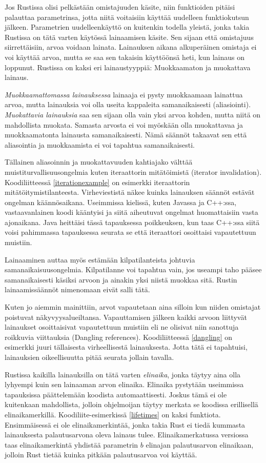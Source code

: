 \documentclass[finnish]{tktltiki2}
\theoremstyle{definition}
\theoremstyle{remark}
\begin{document}
Jos Rustissa olisi pelkästään omistajuuden käsite, niin funktioiden pitäisi palauttaa parametrinsa, jotta niitä voitaisiin käyttää uudelleen funktiokutsun jälkeen. Parametrien uudelleenkäyttö on kuitenkin todella yleistä, jonka takia Rustissa on tätä varten käytössä lainaamisen käsite. Sen sijaan että omistajuus siirrettäisiin, arvoa voidaan lainata. Lainauksen aikana alkuperäinen omistaja ei voi käyttää arvoa, mutta se saa sen takaisin käyttöönsä heti, kun lainaus on loppunut. Rustissa on kaksi eri lainaustyyppiä: Muokkaamaton ja muokattava lainaus.

\textit{Muokkaamattomassa lainauksessa} lainaaja ei pysty muokkaamaan lainattua arvoa, mutta lainauksia voi olla useita kappaleita samanaikaisesti (aliasiointi). \textit{Muokattavia lainauksia} saa sen sijaan olla vain yksi arvoa kohden, mutta niitä on mahdollista muokata. Samasta arvosta ei voi myöskään olla muokattavaa ja muokkaamatonta lainausta samanaikaisesti. Nämä säännöt takaavat sen että aliasointia ja muokkaamista ei voi tapahtua samanaikaisesti.

Tällainen aliasoinnin ja muokattavuuden kahtiajako välttää muistiturvallisuusongelmia kuten iteraattorin mitätöimistä (iterator invalidation). Koodiliitteessä \ref{iterationexample} on esimerkki iteraattorin mitätöitymistilanteesta. Virheviestistä näkee kuinka lainauksen säännöt estävät ongelman käännösaikana. Useimmissa kielissä, kuten Javassa ja C++:ssa, vastaavanlainen koodi kääntyisi ja siitä aiheutuvat ongelmat huomattaisiin vasta ajonaikana. Java heittäisi tässä tapauksessa poikkeuksen, kun taas C++:ssa siitä voisi pahimmassa tapauksessa seurata se että iteraattori osoittaisi vapautettuun muistiin. 

Lainaaminen auttaa myös estämään kilpatilanteista johtuvia samanaikaisuusongelmia. Kilpatilanne voi tapahtua vain, jos useampi taho pääsee samanaikaisesti käsiksi arvoon ja ainakin yksi niistä muokkaa sitä. Rustin lainaamissäännöt nimenomaan eivät salli tätä.

Kuten jo aiemmin mainittiin, arvot vapautetaan aina silloin kun niiden omistajat poistuvat näkyvyysalueiltansa. Vapauttamisen jälkeen kaikki arvoon liittyvät lainaukset osoittaisivat vapautettuun muistiin eli ne olisivat niin sanottuja roikkuvia viittauksia (Dangling references). Koodiliitteessä \ref{dangling} on esimerkki juuri tällaisesta virheellisestä lainauksesta. Jotta tätä ei tapahtuisi, lainauksien oikeellisuutta pitää seurata jollain tavalla. 

Rustissa kaikilla lainauksilla on tätä varten \textit{elinaika}, jonka täytyy aina olla lyhyempi kuin sen lainaaman arvon elinaika. Elinaika pystytään useimmissa tapauksissa päättelemään koodista automaattisesti. Joskus tämä ei ole kuitenkaan mahdollista, jolloin ohjelmoijan täytyy merkata se koodissa erillisellä elinaikamerkillä. Koodiliite-esimerkissä \ref{lifetimes} on kaksi funktiota. Ensimmäisessä ei ole elinaikamerkintää, jonka takia Rust ei tiedä kummasta lainauksesta palautusarvona oleva lainaus tulee. Elinaikamerkatussa versiossa taas elinaikamerkintä yhdistää parametrin $b$ elinajan palautusarvon elinaikaan, jolloin Rust tietää kuinka pitkään palautusarvoa voi käyttää.
\end{document}
